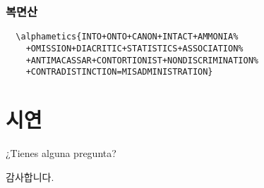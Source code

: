 \documentclass{beamer}
\newcommand{\alphametics}[2][v]{\directlua{puzzle('#1','#2')}}
\begin{document}
%
\begin{frame}[fragile]
  \frametitle{복면산}
  \footnotesize
\begin{verbatim}
  \alphametics{INTO+ONTO+CANON+INTACT+AMMONIA%
    +OMISSION+DIACRITIC+STATISTICS+ASSOCIATION%
    +ANTIMACASSAR+CONTORTIONIST+NONDISCRIMINATION%
    +CONTRADISTINCTION=MISADMINISTRATION}
\end{verbatim}
\end{frame}

%
\section{시연}

%
\begin{frame}
  \huge
  \begin{center}
    ¿Tienes alguna pregunta?
  \end{center}
\end{frame}

%
\begin{frame}
  \huge
  \centering 감사합니다.
\end{frame}
\end{document}
